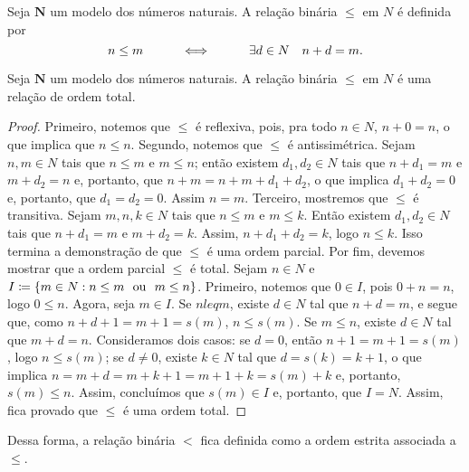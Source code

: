 \begin{defi}
	Seja $\bm N$ um modelo dos números naturais. A relação binária $\leq$ em $N$ é definida por
	\begin{equation*}
	n \leq m \qquad \quad \Longleftrightarrow \quad \qquad \exists d \in N \quad n+d=m.
	\end{equation*}
\end{defi}

\begin{prop}
	Seja $\bm N$ um modelo dos números naturais. A relação binária $\leq$ em $N$ é uma relação de ordem total.
\end{prop}
\begin{proof}
	Primeiro, notemos que $\leq$ é reflexiva, pois, pra todo $n \in N$, $n+0=n$, o que implica que $n \leq n$. Segundo, notemos que $\leq$ é antissimétrica. Sejam $n,m \in N$ tais que $n \leq m$ e $m \leq n$; então existem $d_1,d_2 \in N$ tais que $n+d_1=m$ e $m+d_2=n$ e, portanto, que $n+m=n+m+d_1+d_2$, o que implica $d_1+d_2=0$ e, portanto, que $d_1=d_2=0$. Assim $n=m$. Terceiro, mostremos que $\leq$ é transitiva. Sejam $m,n,k \in N$ tais que $n \leq m$ e $m \leq k$. Então existem $d_1,d_2 \in N$ tais que $n+d_1=m$ e $m+d_2=k$. Assim, $n+d_1+d_2=k$, logo $n \leq k$. Isso termina a demonstração de que $\leq$ é uma ordem parcial. Por fim, devemos mostrar que a ordem parcial $\leq$ é total. Sejam $n \in N$ e $I \coloneqq \{m \in N: n \leq m \ou m \leq n\}$. Primeiro, notemos que $0 \in I$, pois $0+n=n$, logo $0 \leq n$. Agora, seja $m \in I$. Se $n leq m$, existe $d \in N$ tal que $n+d=m$, e segue que, como $n+d+1=m+1=s(m)$, $n \leq s(m)$. Se $m \leq n$, existe $d \in N$ tal que $m+d=n$. Consideramos dois casos: se $d=0$, então $n+1=m+1=s(m)$, logo $n \leq s(m)$; se $d \neq 0$, existe $k \in N$ tal que $d=s(k)=k+1$, o que implica $n=m+d=m+k+1=m+1+k=s(m)+k$ e, portanto, $s(m) \leq n$. Assim, concluímos que $s(m) \in I$ e, portanto, que $I=N$. Assim, fica provado que $\leq$ é uma ordem total.
\end{proof}

	Dessa forma, a relação binária $<$ fica definida como a ordem estrita associada a $\leq$.

